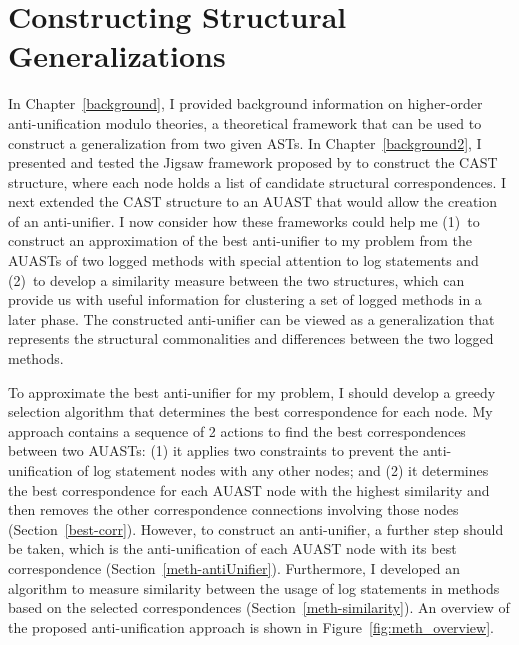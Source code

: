 \chapter{Constructing Structural Generalizations} \label{ch4} \label{methodology}

In Chapter~\ref{background}, I provided background information on higher-order anti-unification modulo theories, a theoretical framework that can be used to construct a generalization from two given ASTs. In Chapter~\ref{background2}, I presented and tested the Jigsaw framework proposed by \citet{2008:fse:cottrell} to construct the CAST structure, where each node holds a list of candidate structural correspondences. I next extended the CAST structure to an AUAST that would allow the creation of an anti-unifier. 
I now consider how these frameworks could help me (1)~to construct an approximation of the best anti-unifier to my problem from the AUASTs of two logged methods with special attention to log statements and (2)~to develop a similarity measure between the two structures, which can provide us with useful information for clustering a set of logged methods in a later phase. The constructed anti-unifier can be viewed as a generalization that represents the structural commonalities and differences between the two logged methods.




To approximate the best anti-unifier for my problem, I should develop a greedy selection algorithm that determines the best correspondence for each node. My approach contains a sequence of 2 actions to find the best correspondences between two AUASTs: (1) it applies two constraints to prevent the anti-unification of log statement nodes with any other nodes; and (2) it determines the best correspondence for each AUAST node with the highest similarity and then removes the other correspondence connections involving those nodes (Section~\ref{best-corr}). However, to construct an anti-unifier, a further step should be taken, which is the anti-unification of each AUAST node with its best correspondence (Section~\ref{meth-antiUnifier}). Furthermore, I developed an algorithm to measure similarity between the usage of log statements in methods based on the selected correspondences (Section~\ref{meth-similarity}). An overview of the proposed anti-unification approach is shown in Figure~\ref{fig:meth_overview}.





